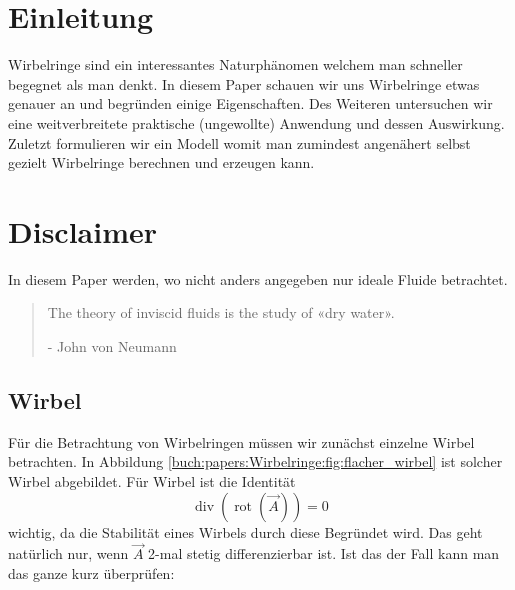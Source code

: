 %
%
%
\section{Einleitung}



Wirbelringe sind ein interessantes Naturphänomen welchem man schneller begegnet als man denkt. 
In diesem Paper schauen wir uns Wirbelringe etwas genauer an und begründen einige Eigenschaften. 
Des Weiteren untersuchen wir eine weitverbreitete praktische (ungewollte) Anwendung und dessen Auswirkung. 
Zuletzt formulieren wir ein Modell womit man zumindest angenähert selbst gezielt Wirbelringe berechnen und erzeugen kann.

\section*{Disclaimer}

In diesem Paper werden, wo nicht anders angegeben nur ideale Fluide betrachtet.

\begin{quote}
    The theory of inviscid fluids is the study of «dry water».

    - John von Neumann \cite{Wirbelringe:feynman1964lectures}
\end{quote}

\subsection{Wirbel}



Für die Betrachtung von Wirbelringen müssen wir zunächst einzelne Wirbel betrachten. 
In Abbildung \ref{buch:papers:Wirbelringe:fig:flacher_wirbel} ist solcher Wirbel abgebildet. 
Für Wirbel ist die Identität
\[
\operatorname{div} \left( \operatorname{rot} \left( \vec{A} \right) \right) 
= 
0
\]
wichtig, da die Stabilität eines Wirbels durch diese Begründet wird.  
Das geht natürlich nur, wenn \(\vec{A}\) 2-mal stetig differenzierbar ist. 
Ist das der Fall kann man das ganze kurz überprüfen:


